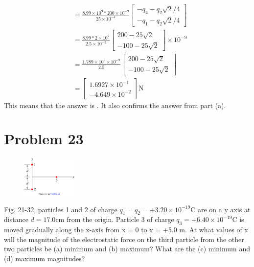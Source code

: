 \documentclass[12pt]{article}
\begin{document}
\begin{align*}
        &=  \frac{8.99 \times 10^{9} * 200 \times 10^{-9}}{25 \times 10^{-4}}\begin{bmatrix}- q_4 - q_2 \sqrt{2}/4\\- q_1 - q_2 \sqrt{2}/4\end{bmatrix}\\
        &=  \frac{8.99 * 2 \times 10^2}{2.5 \times 10^{-3}}\begin{bmatrix} 200 - 25 \sqrt{2} \\ - 100 - 25 \sqrt{2} \end{bmatrix} \times 10^{-9}\\
        &=  \frac{1.789 \times 10^5 \times 10^{-9}}{2.5}\begin{bmatrix} 200 - 25 \sqrt{2} \\ - 100 - 25 \sqrt{2} \end{bmatrix}\\
        &=  \begin{bmatrix} 1.6927 \times 10^{-1} \\ -4.649 \times 10^{-2} \end{bmatrix} \unit{\newton}
\end{align*}
This means that the answer is . It also confirms the answer from part (a). 


\pagebreak
\section*{Problem 23}
\begin{figure}
    \vspace{-30pt}
    \includegraphics[width=0.25\textwidth]{picture_6.png} 
\end{figure}
Fig. 21-32, particles 1 and 2 of charge $q_1 = q_2 = +3.20 \times 10^{-19} \unit{\coulomb}$ are on a y axis at distance $d = 17.0 \unit{\centi\meter}$ from the origin. Particle 3 of charge $q_3 = +6.40 \times 10^{-19} \unit{\coulomb}$ is moved gradually along the x-axis from x = 0 to x = +5.0 m. At what values of x will the magnitude of the electrostatic force on the third particle from the other two particles be (a) minimum and (b) maximum? What are the (c) minimum and (d) maximum magnitudes?
\end{document}
